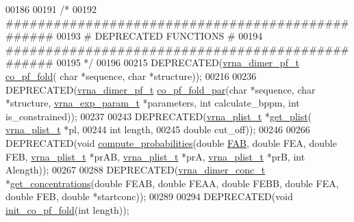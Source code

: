 \begin{DoxyCode}
00186 
00191 \textcolor{comment}{/*}
00192 \textcolor{comment}{#################################################}
00193 \textcolor{comment}{# DEPRECATED FUNCTIONS                          #}
00194 \textcolor{comment}{#################################################}
00195 \textcolor{comment}{*/}
00196 
00215 DEPRECATED(\hyperlink{group__pf__cofold_structvrna__dimer__pf__s}{vrna\_dimer\_pf\_t} \hyperlink{part__func__co_8h_ae5c1e7331718669bdae7a86de2be6184}{co\_pf\_fold}( \textcolor{keywordtype}{char} *sequence, \textcolor{keywordtype}{char} *structure));
00216 
00236 DEPRECATED(\hyperlink{group__pf__cofold_structvrna__dimer__pf__s}{vrna\_dimer\_pf\_t} \hyperlink{part__func__co_8h_aabfc6cb6d02b8f08ac4c92f4f5b125d9}{co\_pf\_fold\_par}(\textcolor{keywordtype}{char} *sequence, \textcolor{keywordtype}{char} *structure, 
      \hyperlink{group__energy__parameters_structvrna__exp__param__s}{vrna\_exp\_param\_t} *parameters, \textcolor{keywordtype}{int} calculate\_bppm, \textcolor{keywordtype}{int} is\_constrained));
00237 
00243 DEPRECATED(\hyperlink{group__data__structures_structvrna__plist__s}{vrna\_plist\_t}  *\hyperlink{part__func__co_8h_a162b6177b14a4156172105a34c09f278}{get\_plist}( \hyperlink{group__data__structures_structvrna__plist__s}{vrna\_plist\_t} *pl,
00244                               \textcolor{keywordtype}{int} length,
00245                               \textcolor{keywordtype}{double} cut\_off));
00246 
00266 DEPRECATED(\textcolor{keywordtype}{void} \hyperlink{part__func__co_8h_a21f8f4a97f904d5d805d571081b2f5f9}{compute\_probabilities}(\textcolor{keywordtype}{double} \hyperlink{group__pf__cofold_a01a87f59db2b7fbf883b056e6f6c673a}{FAB}, \textcolor{keywordtype}{double} FEA, \textcolor{keywordtype}{double} FEB, 
      \hyperlink{group__data__structures_structvrna__plist__s}{vrna\_plist\_t}  *prAB, \hyperlink{group__data__structures_structvrna__plist__s}{vrna\_plist\_t}  *prA, \hyperlink{group__data__structures_structvrna__plist__s}{vrna\_plist\_t}  *prB, \textcolor{keywordtype}{int} 
      Alength));
00267 
00288 DEPRECATED(\hyperlink{group__pf__cofold_structvrna__dimer__conc__s}{vrna\_dimer\_conc\_t} *\hyperlink{part__func__co_8h_a163159722a422ba90335a601fc34b8fb}{get\_concentrations}(\textcolor{keywordtype}{double} FEAB, \textcolor{keywordtype}{double} 
      FEAA, \textcolor{keywordtype}{double} FEBB, \textcolor{keywordtype}{double} FEA, \textcolor{keywordtype}{double} FEB, \textcolor{keywordtype}{double} *startconc));
00289 
00294 DEPRECATED(\textcolor{keywordtype}{void}   \hyperlink{part__func__co_8h_aa12dda9dd6179cdd22bcce87c0682c07}{init\_co\_pf\_fold}(\textcolor{keywordtype}{int} length));

\end{DoxyCode}
